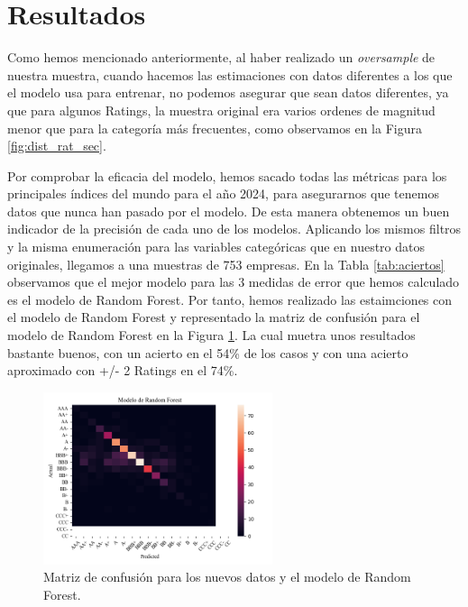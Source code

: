 \documentclass{article}
\begin{document}
\section{Resultados}\label{sec:resultados}

Como hemos mencionado anteriormente, al haber realizado un \textit{oversample} de nuestra muestra, cuando hacemos las estimaciones con datos diferentes a los que el modelo usa para entrenar, no podemos asegurar que sean datos diferentes, ya que para algunos Ratings, la muestra original era varios ordenes de magnitud menor que para la categoría más frecuentes, como observamos en la Figura \ref{fig:dist_rat_sec}.

Por comprobar la eficacia del modelo, hemos sacado todas las métricas para los principales índices del mundo para el año 2024, para asegurarnos que tenemos datos que nunca han pasado por el modelo. De esta manera obtenemos un buen indicador de la precisión de cada uno de los modelos. Aplicando los mismos filtros y la misma enumeración para las variables categóricas que en nuestro datos originales, llegamos a una muestras de 753 empresas. En la Tabla \ref{tab:aciertos} observamos que el mejor modelo para las 3 medidas de error que hemos calculado es el modelo de Random Forest. Por tanto, hemos realizado las estaimciones con el modelo de Random Forest y representado la matriz de confusión para el modelo de Random Forest en la Figura \ref{fig:confusion_matrix_rf_new_data}. La cual muetra unos resultados bastante buenos, con un acierto en el 54\% de los casos y con una acierto aproximado con +/- 2 Ratings en el 74\%.

\begin{figure}[ht]
\centering
\includegraphics[width=0.6\textwidth]{confusion_matrix_rf_new_data.png}
\caption{Matriz de confusión para los nuevos datos y el modelo de Random Forest.}
\label{fig:confusion_matrix_rf_new_data}
\end{figure}
\end{document}
